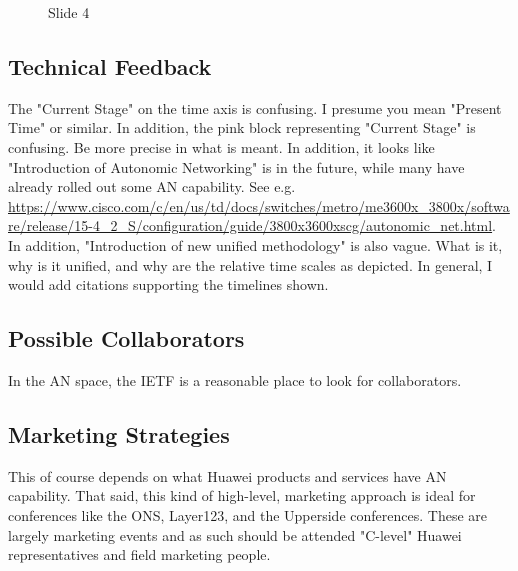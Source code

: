 \documentclass[11pt, oneside]{article}   	%
\begin{document}
\begin{figure}
\caption{Slide 4}
\label{fig:slide4}
\end{figure}


\subsection{Technical Feedback}
\label{slide4:technical_feedback}
The "Current Stage" on the time axis is confusing. I presume you mean  "Present Time" or similar. In addition,  the pink block representing "Current Stage" is confusing. Be more 
precise in what is meant. In addition, it looks like "Introduction of Autonomic Networking" is in the future, while many have already rolled out some AN capability. See e.g. 
\url{https://www.cisco.com/c/en/us/td/docs/switches/metro/me3600x_3800x/software/release/15-4_2_S/configuration/guide/3800x3600xscg/autonomic_net.html}. In addition,
"Introduction of new unified methodology" is also vague. What is it, why is it unified, and why are the relative time scales as depicted. In general, I would add citations supporting
the timelines shown.

\subsection{Possible Collaborators}
\label{slide4:possible_collaborators}
In the AN space, the IETF is a reasonable place to look for collaborators. 

\subsection{Marketing Strategies}
\label{slide4:marketing_strategies}
This of course depends on what Huawei products and services have AN capability. That said, this kind of high-level, marketing approach is ideal for conferences like the ONS,
Layer123, and the Upperside conferences. These are largely marketing events and as such should be attended "C-level" Huawei representatives and field marketing people.
\end{document}
